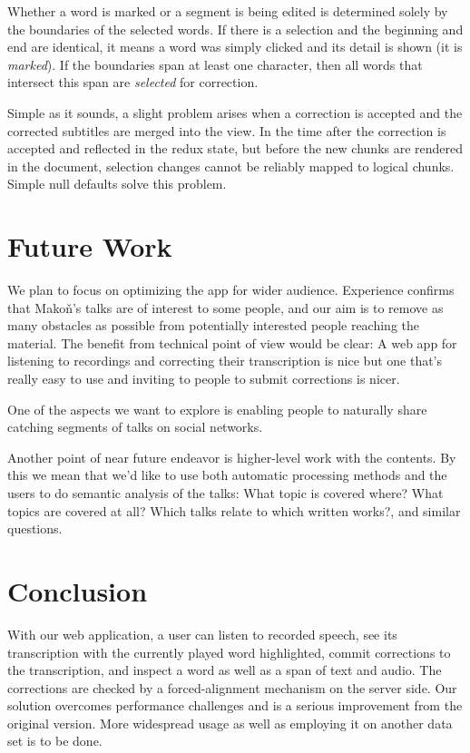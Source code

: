 \documentclass{svproc}
\begin{document}
Whether a word is marked or a segment is being edited is determined solely by
the boundaries of the selected words. If there is a selection and the beginning
and end are identical, it means a word was simply clicked and its detail is
shown (it is {\em marked}). If the boundaries span at least one character, then
all words that intersect this span are {\em selected} for correction.

Simple as it sounds, a slight problem arises when a correction is accepted and
the corrected subtitles are merged into the view. In the time after the
correction is accepted and reflected in the redux state, but before the new
chunks are rendered in the document, selection changes cannot be reliably mapped
to logical chunks. Simple null defaults solve this problem.

\section{Future Work}

We plan to focus on optimizing the app for wider audience. Experience confirms
that Mako\v{n}'s talks are of interest to some people, and our aim is to
remove as many obstacles as possible from potentially interested people reaching
the material. The benefit from technical point of view would be clear: A web app
for listening to recordings and correcting their transcription is nice but one
that's really easy to use and inviting to people to submit corrections is nicer.

One of the aspects we want to explore is enabling people to naturally share
catching segments of talks on social networks.

Another point of near future endeavor is higher-level work with the contents. By
this we mean that we'd like to use both automatic processing methods and the
users to do semantic analysis of the talks: What topic is covered where? What
topics are covered at all? Which talks relate to which written works?, and
similar questions.

\section{Conclusion}

With our web application, a user can listen to recorded speech, see its
transcription with the currently played word highlighted, commit corrections to
the transcription, and inspect a word as well as a span of text and audio. The
corrections are checked by a forced-alignment mechanism on the server side. Our
solution overcomes performance challenges and is a serious improvement from the
original version. More widespread usage as well as employing it on another data
set is to be done.
\end{document}
